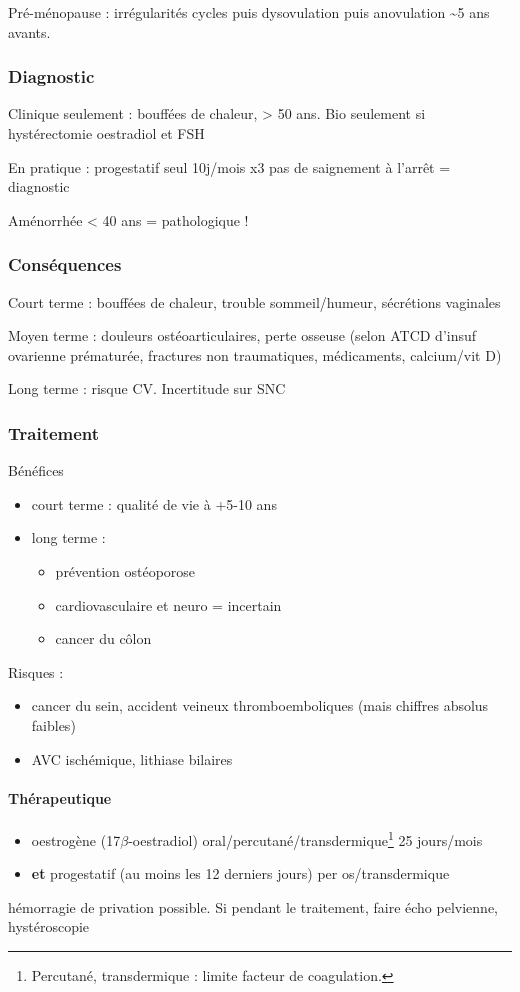 \documentclass[11pt]{article}
\begin{document}
Pré-ménopause : irrégularités cycles puis dysovulation puis anovulation \textasciitilde{}5 ans
avants.

\subsubsection{Diagnostic}
\label{sec:org1c5130e}
Clinique seulement \danger : bouffées de chaleur, \female > 50 ans. Bio
seulement si hystérectomie \thus \dec oestradiol et \inc FSH

En pratique : progestatif seul 10j/mois x3 \thus pas de saignement à l'arrêt =
diagnostic

Aménorrhée < 40 ans = pathologique !

\subsubsection{Conséquences}
\label{sec:org2effae8}
Court terme : bouffées de chaleur, trouble sommeil/humeur, \dec sécrétions
vaginales

Moyen terme : douleurs ostéoarticulaires, \inc perte osseuse (selon ATCD d'insuf
ovarienne prématurée, fractures non traumatiques, médicaments, calcium/vit D)

Long terme : \inc risque CV. Incertitude sur SNC

\subsubsection{Traitement}
\label{sec:orge65ebbb}
Bénéfices
\begin{itemize}
\item court terme : qualité de vie à +5-10 ans
\item long terme :
\begin{itemize}
\item prévention ostéoporose
\item cardiovasculaire et neuro = incertain
\item cancer du côlon
\end{itemize}
\end{itemize}
Risques :
\begin{itemize}
\item \inc cancer du sein, accident veineux thromboemboliques (mais chiffres absolus
faibles)
\item \inc AVC ischémique, lithiase bilaires
\end{itemize}

\paragraph{Thérapeutique}
\label{sec:org7f89864}
\begin{itemize}
\item oestrogène (17\(\beta\)-oestradiol) oral/percutané/transdermique\footnote{Percutané, transdermique : limite \inc facteur de coagulation.} 25 jours/mois
\item \textbf{et} progestatif (au moins les 12 derniers jours) per os/transdermique
\end{itemize}
\danger hémorragie de privation possible. Si pendant le traitement, faire écho
pelvienne, hystéroscopie
\end{document}
